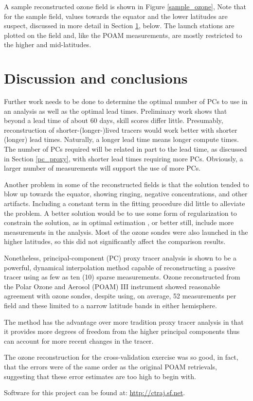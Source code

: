A sample reconstructed ozone field is shown in Figure \ref{sample_ozone}, 
Note that for the sample field, values towards the equator and the
lower latitudes are suspect, discussed in more detail in 
Section \ref{discussion}, below.
The launch stations are plotted on the field and, like the POAM
measurements, are mostly restricted to the higher and mid-latitudes.

\section{Discussion and conclusions}

\label{discussion}
Further work needs to be done to determine the optimal number
of PCs to use in an analysis as well as the
optimal lead times.
Preliminary work shows that beyond a lead time of about 60 days,
skill scores differ little.
Presumably, reconstruction of shorter-(longer-)lived tracers would work better
with shorter (longer) lead times.
Naturally, a longer lead time means longer compute times.
The number of PCs required will
be related in part to the lead time, as discussed in Section \ref{pc_proxy},
with shorter lead times requiring more PCs.
Obviously, a larger number of measurements will support the use of
more PCs.

Another problem in some of the reconstructed fields is that the solution
tended to blow up towards the equator, showing ringing, negative concentrations,
and other artifacts.
Including a constant term in the fitting procedure did little 
to alleviate the problem.
A better solution would be to use some form of regularization to constrain
the solution, as in optimal estimation \citep{Rodgers2000}, or better still,
include more measurements in the analysis.
Most of the ozone sondes were also launched in the higher
latitudes, so this did not significantly affect the comparison results.

Nonetheless, principal-component (PC) proxy tracer analysis
is shown to be a powerful, dynamical interpolation method
capable of reconstructing a passive tracer using as few as 
ten (10) sparse measurements.
Ozone reconstructed from the Polar Ozone and Aerosol (POAM) III
instrument showed reasonable agreement with ozone sondes,
despite using, on average, 52 measurements per field and these
limited to a narrow latitude bands in either hemisphere.

The method has the advantage over more tradition proxy tracer analysis
in that it provides more degrees of freedom from the higher principal 
components thus can account for more recent changes in the tracer.

The ozone reconstruction for the cross-validation exercise was so good,
in fact, that the errors were of the same order as the original POAM
retrievals, suggesting that these error estimates are too high to
begin with.

Software for this project can be found at: \url{http://ctraj.sf.net}.

